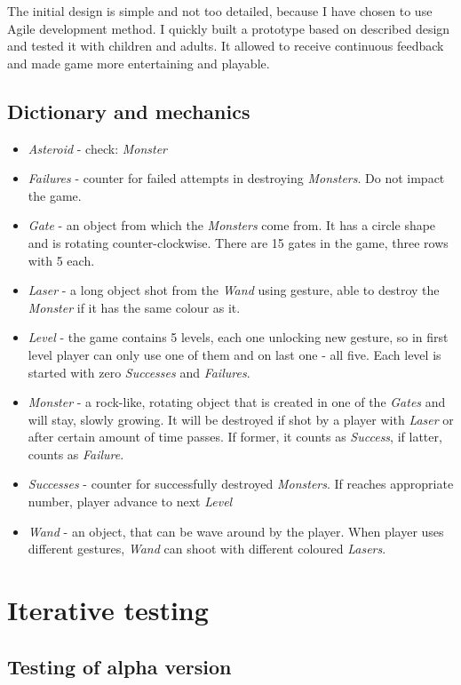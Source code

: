 The initial design is simple and not too detailed, because I have chosen to use Agile development method. I quickly built a prototype based on described design and tested it with children and adults. It allowed to receive continuous feedback and made game more entertaining and playable.

\subsection{Dictionary and mechanics}
\begin{itemize}
\item \emph{Asteroid} - check: \emph{Monster}
\item \emph{Failures} - counter for failed attempts in destroying \emph{Monsters}. Do not impact the game. 
\item \emph{Gate} - an object from which the \emph{Monsters} come from. It has a circle shape and is rotating counter-clockwise. There are 15 gates in the game, three rows with 5 each.
\item \emph{Laser} - a long object shot from the \emph{Wand} using gesture, able to destroy the \emph{Monster} if it has the same colour as it.
\item \emph{Level} - the game contains 5 levels, each one unlocking new gesture, so in first level player can only use one of them and on last one - all five. Each level is started with zero \emph{Successes} and \emph{Failures}.
\item \emph{Monster} - a rock-like, rotating object that is created in one of the \emph{Gates} and will stay, slowly growing. It will be destroyed if shot by a player with \emph{Laser} or after certain amount of time passes. If former, it counts as \emph{Success}, if latter, counts as \emph{Failure}. 
\item \emph{Successes} - counter for successfully destroyed \emph{Monsters}. If reaches appropriate number, player advance to next \emph{Level}
\item \emph{Wand} - an object, that can be wave around by the player. When player uses different gestures, \emph{Wand} can shoot with different coloured \emph{Lasers}. 
\end{itemize}

\section{Iterative testing}
\subsection{Testing of alpha version}

